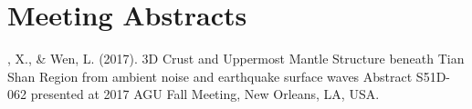 \section*{Meeting Abstracts}
\begin{etaremune}
\item
    \Xiao, X., \& Wen, L. (2017).
    3D Crust and Uppermost Mantle Structure beneath Tian Shan Region from ambient noise and earthquake surface waves 
    Abstract S51D-062 presented at 2017 AGU Fall Meeting, New Orleans, LA, USA.
\end{etaremune}
